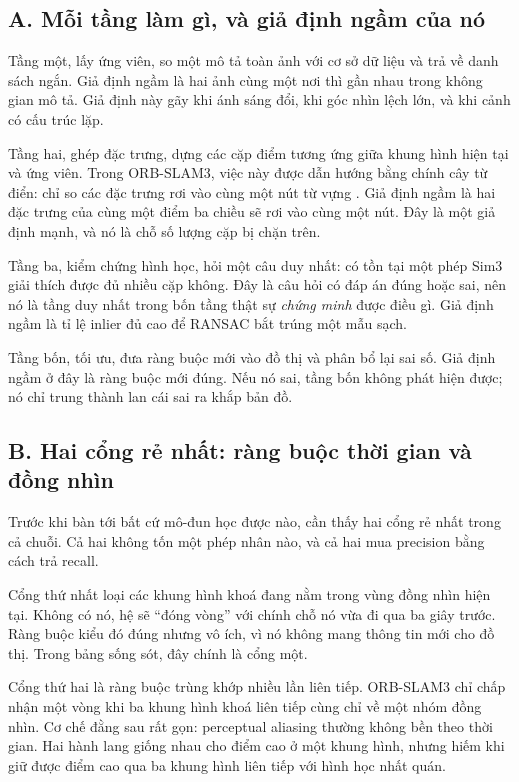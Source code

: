 \documentclass[../../deep_learning.tex]{subfiles}
\begin{document}
\subsection{A. Mỗi tầng làm gì, và giả định ngầm của nó}
Tầng một, lấy ứng viên, so một mô tả toàn ảnh với cơ sở dữ liệu và trả về danh sách ngắn. Giả định ngầm là hai ảnh cùng một nơi thì gần nhau trong không gian mô tả. Giả định này gãy khi ánh sáng đổi, khi góc nhìn lệch lớn, và khi cảnh có cấu trúc lặp.

Tầng hai, ghép đặc trưng, dựng các cặp điểm tương ứng giữa khung hình hiện tại và ứng viên. Trong ORB-SLAM3, việc này được dẫn hướng bằng chính cây từ điển: chỉ so các đặc trưng rơi vào cùng một nút từ vựng \cite{campos2021orbslam3}. Giả định ngầm là hai đặc trưng của cùng một điểm ba chiều sẽ rơi vào cùng một nút. Đây là một giả định mạnh, và nó là chỗ số lượng cặp bị chặn trên.

Tầng ba, kiểm chứng hình học, hỏi một câu duy nhất: có tồn tại một phép Sim3 giải thích được đủ nhiều cặp không. Đây là câu hỏi có đáp án đúng hoặc sai, nên nó là tầng duy nhất trong bốn tầng thật sự \emph{chứng minh} được điều gì. Giả định ngầm là tỉ lệ inlier đủ cao để RANSAC bắt trúng một mẫu sạch.

Tầng bốn, tối ưu, đưa ràng buộc mới vào đồ thị và phân bổ lại sai số. Giả định ngầm ở đây là ràng buộc mới đúng. Nếu nó sai, tầng bốn không phát hiện được; nó chỉ trung thành lan cái sai ra khắp bản đồ.

\subsection{B. Hai cổng rẻ nhất: ràng buộc thời gian và đồng nhìn}
Trước khi bàn tới bất cứ mô-đun học được nào, cần thấy hai cổng rẻ nhất trong cả chuỗi. Cả hai không tốn một phép nhân nào, và cả hai mua precision bằng cách trả recall.

Cổng thứ nhất loại các khung hình khoá đang nằm trong vùng đồng nhìn hiện tại. Không có nó, hệ sẽ ``đóng vòng'' với chính chỗ nó vừa đi qua ba giây trước. Ràng buộc kiểu đó đúng nhưng vô ích, vì nó không mang thông tin mới cho đồ thị. Trong bảng sống sót, đây chính là cổng một.

Cổng thứ hai là ràng buộc trùng khớp nhiều lần liên tiếp. ORB-SLAM3 chỉ chấp nhận một vòng khi ba khung hình khoá liên tiếp cùng chỉ về một nhóm đồng nhìn. Cơ chế đằng sau rất gọn: perceptual aliasing thường không bền theo thời gian. Hai hành lang giống nhau cho điểm cao ở một khung hình, nhưng hiếm khi giữ được điểm cao qua ba khung hình liên tiếp với hình học nhất quán.
\end{document}
